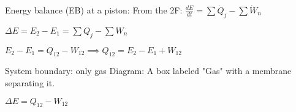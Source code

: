 Energy balance (EB) at a piston:  
From the 2F:  
\( \frac{dE}{dt} = \sum \dot{Q}_j - \sum \dot{W}_n \)  

\( \Delta E = E_2 - E_1 = \sum Q_j - \sum W_n \)  

\( E_2 - E_1 = Q_{12} - W_{12} \implies Q_{12} = E_2 - E_1 + W_{12} \)  

System boundary: only gas  
Diagram: A box labeled "Gas" with a membrane separating it.  

\( \Delta E = Q_{12} - W_{12} \)